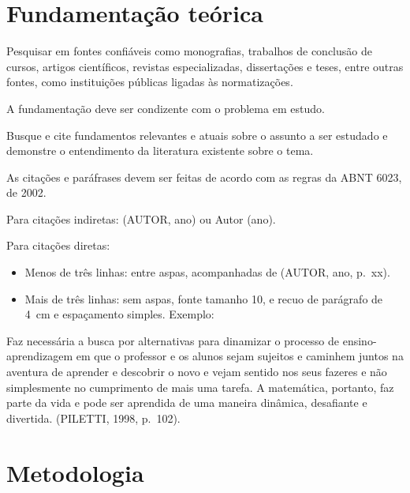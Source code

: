 \section{Fundamentação teórica}\label{sec:fundamentacao}

Pesquisar em fontes confiáveis como monografias, trabalhos de conclusão de
cursos, artigos científicos, revistas especializadas, dissertações e teses,
entre outras fontes, como instituições públicas ligadas às normatizações.

A fundamentação deve ser condizente com o problema em estudo.

Busque e cite fundamentos relevantes e atuais sobre o assunto a ser estudado
e demonstre o entendimento da literatura existente sobre o tema.

As citações e paráfrases devem ser feitas de acordo com as regras da ABNT
6023, de 2002.

Para citações indiretas: (AUTOR, ano) ou Autor (ano).

Para citações diretas:

\begin{itemize}
    \item Menos de três linhas: entre aspas, acompanhadas de (AUTOR, ano,
          p.~xx).
    \item Mais de três linhas: sem aspas, fonte tamanho 10, e recuo de
          parágrafo de 4~cm e espaçamento simples. Exemplo:
\end{itemize}

\begin{citacao}
    Faz necessária a busca por alternativas para dinamizar o processo de
    ensino-aprendizagem em que o professor e os alunos sejam sujeitos e
    caminhem juntos na aventura de aprender e descobrir o novo e vejam
    sentido nos seus fazeres e não simplesmente no cumprimento de mais uma
    tarefa. A matemática, portanto, faz parte da vida e pode ser aprendida
    de uma maneira dinâmica, desafiante e divertida. (PILETTI, 1998, p.~102).
\end{citacao}

\section{Metodologia}\label{sec:metodologia}

